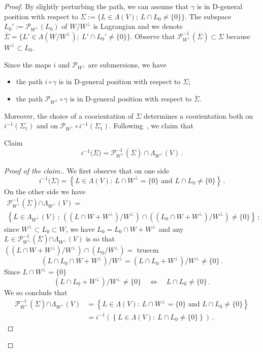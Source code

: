 \documentclass[AHL, Unicode, longabstracts, published]{cedram}
\renewcommand*\P{\mathcal{P}}
\begin{document}
\begin{proof}
By slightly perturbing the path, we can assume that $\gamma$ is in D-general position with respect to $\Sigma:=\{L\in\Lambda(V) ;\ L\cap L_0\neq \{0\}\}$. The subspace $L_0':= \P_{W^\perp}(L_0)$ of $W/W^\perp$ is Lagrangian and we denote $\overline{\Sigma}=\{L'\in\Lambda(W/W^\perp) ;\ L'\cap L_0'\neq\{0\}\}$. Observe that $\P_{W^\perp}^{-1}(\overline{\Sigma})\subset\Sigma$ because $W^\bot\subset L_0$.


Since the maps $i$ and $\P_{W^\perp}$ are submersions, we have
\begin{itemize}
\item the path $i\circ\gamma$ is in D-general position with respect to $\Sigma$;
\item the path $\P_{W^\perp}\circ\gamma$ is in D-general position with respect to $\overline{\Sigma}$.
\end{itemize}


Moreover, the choice of a coorientation of $\Sigma$ determines a coorientation both on $i^{-1}(\Sigma_1)$ and on $\P_{W^\perp}\circ i^{-1}(\Sigma_1)$. Following~\cite{Vit1987}, we claim that

\begin{enonce}{Claim}\label{claim23}
\[
i^{-1}({\Sigma)=
\P_{W^\perp}^{-1}(\overline{\Sigma}) \cap \Lambda_{W^\bot}(V)}\,.
\]
\end{enonce}

\begin{proof}[Proof of the claim.]We first observe that on one side
\[
i^{-1}({\Sigma)}=
\left\{ L\in\Lambda(V) :\ L\cap W^\perp=\{0\}\text{ and } L\cap L_0\neq\{0\} \right\}\,.
\]
On the other side we have
\begin{multline*}
\P_{W^\perp}^{-1}\left({\overline{\Sigma}}\right){\cap \Lambda_{W^\bot}(V)}=
\\
\left\{ L\in{ \Lambda_{W^\bot}(V)}\, ;\, \left((L\cap W+W^\perp)/W^\perp\right)\cap \left((L_0\cap W+W^\perp)/W^\perp\right)\neq \{0\} \right\}\, ;
\end{multline*}
since $W^\perp\subset L_0\subset W$, we have $L_0=L_0\cap W+W^\perp$ and any $L\in \P_{W^\perp}^{-1}({\overline{\Sigma}}){\cap \Lambda_{W^\bot}(V)}$ is so that\\
$ ((L\cap W+W^\perp)/W^\perp)\cap ({L_0 }/W^\perp)=$ truecm
\[
\left(L\cap L_0\cap W+W^\perp\right)/W^\perp=\left(L\cap L_0+W^\perp\right)/W^\perp\neq \{0\}\,.
\]
Since $L\cap W^\perp=\{0\}$
\[
\left(L\cap L_0+W^\perp\right)/W^\perp\neq \{0\}\quad\Leftrightarrow\quad L\cap L_0\neq \{0\}\,.
\]
We so conclude that
\begin{align*}
\P_{W^\perp}^{-1}({\overline{\Sigma}}){\cap \Lambda_{W^\bot}(V)}&=
\left\{ L\in \Lambda(V) :\ L\cap W^\perp=\{0\}\text{ and } L\cap L_0\neq \{0\}
\right\}\\
&=i^{-1}\left(\left\{ L\in\Lambda(V) :\ L\cap L_0\neq\{0\}\right\}\right)\,.
\end{align*}
\end{proof}



\end{proof}
\end{document}
